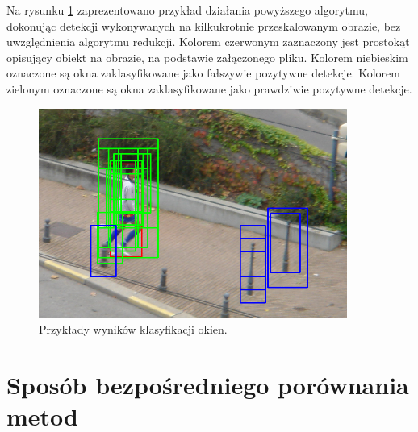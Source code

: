 Na rysunku \ref{fig:detections} zaprezentowano przykład działania powyższego algorytmu, dokonując detekcji wykonywanych na kilkukrotnie przeskalowanym obrazie, bez uwzględnienia algorytmu redukcji. Kolorem czerwonym zaznaczony jest prostokąt opisujący obiekt na obrazie, na podstawie załączonego pliku. Kolorem niebieskim oznaczone są okna zaklasyfikowane jako fałszywie pozytywne detekcje. Kolorem zielonym oznaczone są okna zaklasyfikowane jako prawdziwie pozytywne detekcje.

\begin{figure}[htb]
\centering
\includegraphics[width=0.9\textwidth]{ch4_dets.png}
\caption{Przykłady wyników klasyfikacji okien.}
\label{fig:detections}
\end{figure}


\section{Sposób bezpośredniego porównania metod}
\label{sec:porownanie}

